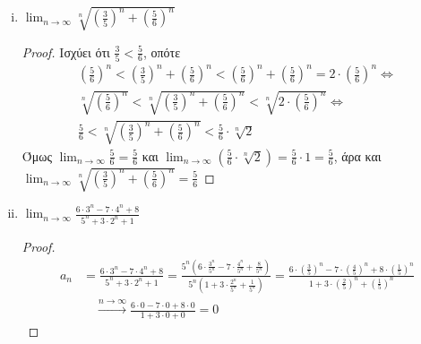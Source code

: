 \documentclass[a4paper,table]{report}
\begin{document}
\begin{enumerate}
\begin{enumerate}[i)]
      \item $ \lim_{n \to \infty} \sqrt[n]{\left(\frac{3}{5}\right)^{n}+
        \left(\frac{5}{6}\right)^{n}} $
        \begin{proof}
          Ισχύει ότι $ \frac{3}{5} < \frac{5}{6} $, οπότε
          \begin{gather*}
            \left(\frac{5}{6}\right)^{n} < \left(\frac{3}{5}\right)^{n}+ 
            \left(\frac{5}{6}\right)^{n} < \left(\frac{5}{6}\right)^{n} + 
            \left(\frac{5}{6}\right)^{n} = 2 \cdot 
            \left(\frac{5}{6}\right)^{n} 
            \Leftrightarrow \\
            \sqrt[n]{\left(\frac{5}{6}\right)^{n}} < 
            \sqrt[n]{\left(\frac{3}{5}\right)^{n}+ 
            \left(\frac{5}{6}\right)^{n}} < 
            \sqrt[n]{2\cdot \left(\frac{5}{6}\right)^{n}} 
            \Leftrightarrow \\
            \frac{5}{6} < \sqrt[n]{\left(\frac{3}{5}\right)^{n}+ 
            \left(\frac{5}{6}\right)^{n}} < \frac{5}{6} \cdot 
            \sqrt[n]{2} 
          \end{gather*}
          Όμως $ \lim_{n \to \infty} \frac{5}{6} = \frac{5}{6} $ και 
          $ \lim_{n \to \infty} \left(\frac{5}{6} \cdot \sqrt[n]{2}\right) = 
          \frac{5}{6} \cdot 1 = \frac{5}{6} $, άρα και $ 
          \lim_{n \to \infty} \sqrt[n]{\left(\frac{3}{5} \right)^{n} + 
          \left(\frac{5}{6}\right)^{n}} = \frac{5}{6} $
        \end{proof}

      \item $ \lim_{n \to \infty} \frac{6\cdot 3^{n}-7 \cdot 4^{n}+8}
        {5^{n}+3\cdot 2^{n}+1} $ 
        \begin{proof}
          \begin{align*}
            a_{n} 
                        &= \frac{6\cdot 3^{n}-7 \cdot 4^{n}+8} {5^{n}+3
                        \cdot 2^{n}+1} = 
                        \frac{5^{n}\left(6\cdot \frac{3^{n}}{5^{n}}  - 7 \cdot 
                            \frac{4^{n}}{5^{n}} + 
                            \frac{8}{5^{n}}\right)}{5^{n}\left(1 + 3 
                        \cdot \frac{2^{n}}{5^{n}} + \frac{1}{5^{n}}\right)} = 
                        \frac{6\cdot (\frac{3}{5} )^{n}-7\cdot (\frac{4}{5} )^{n} +8
                          \cdot ( \frac{1}{5} )^{n}}{1 + 3\cdot (\frac{2}{5} )^{n}+ 
                        (\frac{1}{5} )^{n}} \\
                        & \quad \xrightarrow{n \to \infty}  
                        \frac{6 \cdot 0 -7 \cdot 0 + 8 \cdot 0}{1 + 3 \cdot 0 + 0} = 0  
          \end{align*} 
        \end{proof}


\end{enumerate}
\end{enumerate}
\end{document}
